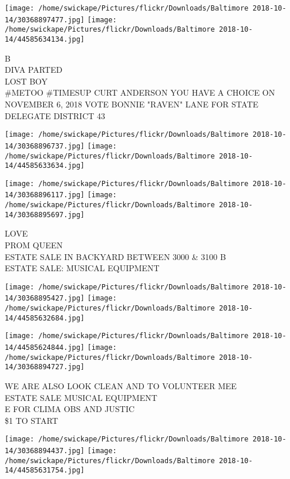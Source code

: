 \documentclass[10pt,letterpaper]{article}
\begin{document}
\texttt{[image: /home/swickape/Pictures/flickr/Downloads/Baltimore 2018-10-14/30368897477.jpg]}
\texttt{[image: /home/swickape/Pictures/flickr/Downloads/Baltimore 2018-10-14/44585634134.jpg]}

B\\
DIVA PARTED\\
LOST BOY\\
\#METOO \#TIMESUP CURT ANDERSON YOU HAVE A CHOICE ON NOVEMBER 6, 2018 VOTE BONNIE "RAVEN" LANE FOR STATE DELEGATE DISTRICT 43\\
\pagebreak

\texttt{[image: /home/swickape/Pictures/flickr/Downloads/Baltimore 2018-10-14/30368896737.jpg]}
\texttt{[image: /home/swickape/Pictures/flickr/Downloads/Baltimore 2018-10-14/44585633634.jpg]}

\texttt{[image: /home/swickape/Pictures/flickr/Downloads/Baltimore 2018-10-14/30368896117.jpg]}
\texttt{[image: /home/swickape/Pictures/flickr/Downloads/Baltimore 2018-10-14/30368895697.jpg]}

LOVE\\
PROM QUEEN\\
ESTATE SALE IN BACKYARD BETWEEN 3000 \& 3100 B\\
ESTATE SALE: MUSICAL EQUIPMENT\\
\pagebreak

\texttt{[image: /home/swickape/Pictures/flickr/Downloads/Baltimore 2018-10-14/30368895427.jpg]}
\texttt{[image: /home/swickape/Pictures/flickr/Downloads/Baltimore 2018-10-14/44585632684.jpg]}

\texttt{[image: /home/swickape/Pictures/flickr/Downloads/Baltimore 2018-10-14/44585624844.jpg]}
\texttt{[image: /home/swickape/Pictures/flickr/Downloads/Baltimore 2018-10-14/30368894727.jpg]}

WE ARE ALSO LOOK CLEAN AND TO VOLUNTEER MEE\\
ESTATE SALE MUSICAL EQUIPMENT\\
E FOR CLIMA OBS AND JUSTIC\\
\$1 TO START\\
\pagebreak

\texttt{[image: /home/swickape/Pictures/flickr/Downloads/Baltimore 2018-10-14/30368894437.jpg]}
\texttt{[image: /home/swickape/Pictures/flickr/Downloads/Baltimore 2018-10-14/44585631754.jpg]}
\end{document}
